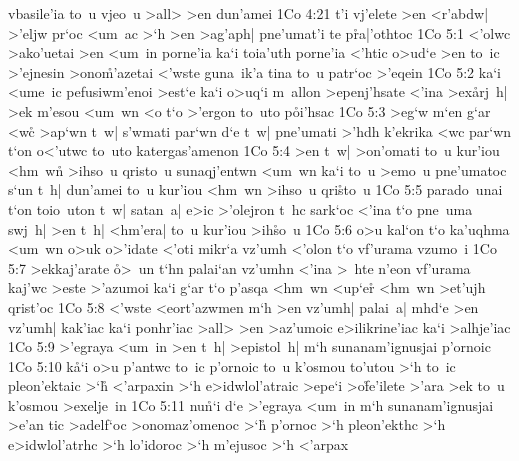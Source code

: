 vbasile'ia
to~u
vjeo~u
>all>
>en
dun'amei\bibvsend
\vs 1Co 4:21
t'i
vj'elete
>en
<r'abdw|
>'eljw
pr`oc
<um~ac
>`h
>en
>ag'aph|
pne'umat'i
te
p\r{r}a|'othtoc\bibvsend
{}
\vs 1Co 5:1
<'olwc
>ako'uetai
>en
<um~in
porne'ia
ka`i
toia'uth
porne'ia
<'htic
o>ud`e
>en
to~ic
>'ejnesin
>ono\r{m}'azetai
<'wste
guna~ik'a
tina
to~u
patr`oc
>'eqein\bibvsend
\vs 1Co 5:2
ka`i
<ume~ic
pefusiwm'enoi
>est`e
ka`i
o>uq`i
m~allon
>epenj'hsate
<'ina
>ex\r{a}rj~h|
>ek
m'esou
<um~wn
<o
t`o
>'ergon
to~uto
p\r{o}i'hsac\bibvsend
{}
\vs 1Co 5:3
>eg`w
m`en
g`ar
<w\r{c}
>ap`wn
t~w|
s'wmati
par`wn
d`e
t~w|
pne'umati
>'hdh
k'ekrika
<wc
par`wn
t`on
o<'utwc
to~uto
katergas'amenon\bibvsend
\vs 1Co 5:4
>en
t~w|
>on'omati
to~u
kur'iou
<hm~wn\r{}
>ihso~u
qristo~u
sunaqj'entwn
<um~wn
ka`i
to~u
>emo~u
pne'umatoc
s`un
t~h|
dun'amei
to~u
kur'iou
<hm~wn
>ihso~u
qri\r{s}to~u\bibvsend
{}
\vs 1Co 5:5
parado~unai
t`on
toio~uton
t~w|
satan~a|
e>ic
>'olejron
t~hc
sark`oc
<'ina
t`o
pne~uma
swj~h|
>en
t~h|
<hm'era|
to~u
kur'iou
>ih\r{s}o~u\bibvsend
{}
\vs 1Co 5:6
o>u
kal`on
t`o
ka'uqhma
<um~wn
o>uk
o>'idate
<'oti
mikr`a
vz'umh
<'olon
t`o
vf'urama
vzumo~i\bibvsend
\vs 1Co 5:7
>ekkaj'arate
\r{o}>~un
t`hn
palai`an
vz'umhn
<'ina
>~hte
n'eon
vf'urama
kaj'wc
>este
>'azumoi
ka`i
g`ar
t`o
p'asqa
<hm~wn
<up`er\r{}
<hm~wn
>et'ujh
qrist'oc\bibvsend
\vs 1Co 5:8
<'wste
<eort'azwmen
m`h
>en
vz'umh|
palai~a|
mhd`e
>en
vz'umh|
kak'iac
ka`i
ponhr'iac
>all>
>en
>az'umoic
e>ilikrine'iac
ka`i
>alhje'iac\bibvsend
\vs 1Co 5:9
>'egraya
<um~in
>en
t~h|
>epistol~h|
m`h
sunanam'ignusjai
p'ornoic\bibvsend
\vs 1Co 5:10
k\r{a}`i
o>u
p'antwc
to~ic
p'ornoic
to~u
k'osmou
to'utou
>`h
to~ic
pleon'ektaic
>`h\r{}
<'arpaxin
>`h
e>idwlol'atraic
>epe`i
>o\r{f}e'ilete
>'ara
>ek
to~u
k'osmou
>exelje~in\bibvsend
\vs 1Co 5:11
nu\r{n}`i
d`e
>'egraya
<um~in
m`h
sunanam'ignusjai
>e'an
tic
>adelf`oc
>onomaz'omenoc
>`h\r{}
p'ornoc
>`h
pleon'ekthc
>`h
e>idwlol'atrhc
>`h
lo'idoroc
>`h
m'ejusoc
>`h
<'arpax

